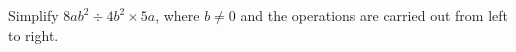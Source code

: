 Simplify $8ab^2\div4b^2\times5a$, where $b\ne0$ and the operations are carried out from left to right.
